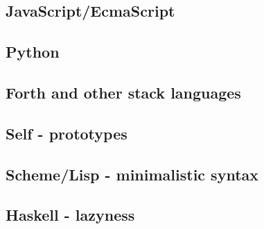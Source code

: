 \subsection{JavaScript/EcmaScript}
\subsection{Python}
\subsection{Forth and other stack languages}
\subsection{Self - prototypes}
\subsection{Scheme/Lisp - minimalistic syntax}
\subsection{Haskell - lazyness}

